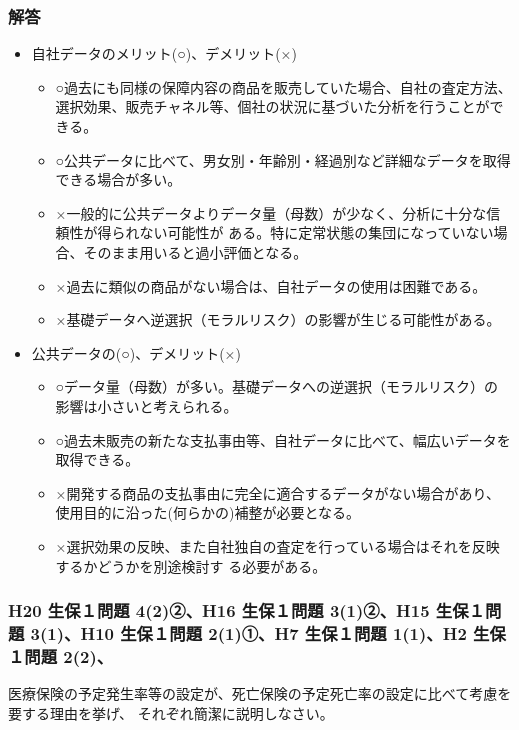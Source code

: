 \documentclass[report,gutter=10mm,fore-edge=10mm,uplatex,dvipdfmx]{jlreq}
\begin{document}
\subsubsection{解答}
\begin{itemize}
 \item 自社データのメリット(○)、デメリット(×)
\begin{itemize}
 \item ○過去にも同様の保障内容の商品を販売していた場合、自社の査定方法、選択効果、販売チャネル等、個社の状況に基づいた分析を行うことができる。
 \item ○公共データに比べて、男女別・年齢別・経過別など詳細なデータを取得できる場合が多い。
 \item ×一般的に公共データよりデータ量（母数）が少なく、分析に十分な信頼性が得られない可能性が
ある。特に定常状態の集団になっていない場合、そのまま用いると過小評価となる。
 \item ×過去に類似の商品がない場合は、自社データの使用は困難である。
 \item ×基礎データへ逆選択（モラルリスク）の影響が生じる可能性がある。
\end{itemize}
 \item 公共データの(○)、デメリット(×)
\begin{itemize}
 \item ○データ量（母数）が多い。基礎データへの逆選択（モラルリスク）の影響は小さいと考えられる。
 \item ○過去未販売の新たな支払事由等、自社データに比べて、幅広いデータを取得できる。
 \item ×開発する商品の支払事由に完全に適合するデータがない場合があり、使用目的に沿った(何らかの)補整が必要となる。
 \item ×選択効果の反映、また自社独自の査定を行っている場合はそれを反映するかどうかを別途検討す
る必要がある。
\end{itemize}
\end{itemize}

\subsubsection{H20 生保１問題 4(2)②、H16 生保１問題 3(1)②、H15 生保１問題 3(1)、H10 生保１問題 2(1)①、H7 生保１問題 1(1)、H2 生保１問題 2(2)、}
医療保険の予定発生率等の設定が、死亡保険の予定死亡率の設定に比べて考慮を要する理由を挙げ、
それぞれ簡潔に説明しなさい。
\end{document}
